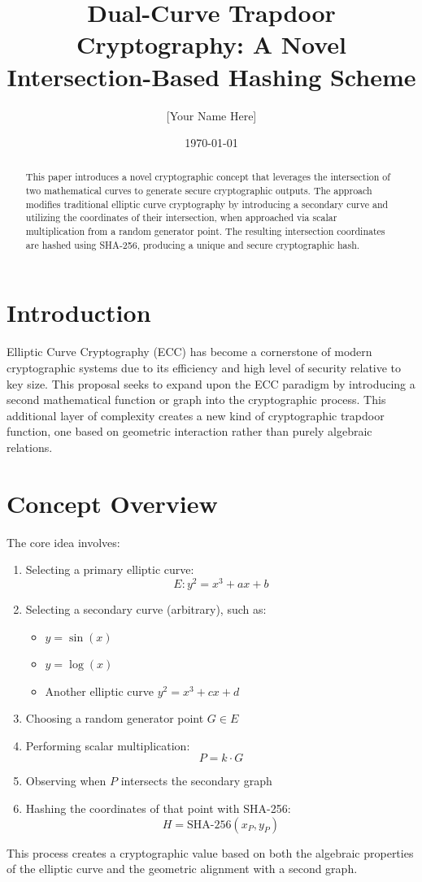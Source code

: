 \documentclass{article}
\title{Dual-Curve Trapdoor Cryptography: A Novel Intersection-Based Hashing Scheme}
\author{[Your Name Here]}
\date{\today}
\begin{document}
\maketitle

\begin{abstract}
This paper introduces a novel cryptographic concept that leverages the intersection of two mathematical curves to generate secure cryptographic outputs. The approach modifies traditional elliptic curve cryptography by introducing a secondary curve and utilizing the coordinates of their intersection, when approached via scalar multiplication from a random generator point. The resulting intersection coordinates are hashed using SHA-256, producing a unique and secure cryptographic hash.
\end{abstract}

\section{Introduction}
Elliptic Curve Cryptography (ECC) has become a cornerstone of modern cryptographic systems due to its efficiency and high level of security relative to key size. This proposal seeks to expand upon the ECC paradigm by introducing a second mathematical function or graph into the cryptographic process. This additional layer of complexity creates a new kind of cryptographic trapdoor function, one based on geometric interaction rather than purely algebraic relations.

\section{Concept Overview}
The core idea involves:
\begin{enumerate}
  \item Selecting a primary elliptic curve:
  \[ E: y^2 = x^3 + ax + b \]
  \item Selecting a secondary curve (arbitrary), such as:
  \begin{itemize}
    \item \( y = \sin(x) \)
    \item \( y = \log(x) \)
    \item Another elliptic curve \( y^2 = x^3 + cx + d \)
  \end{itemize}
  \item Choosing a random generator point \( G \in E \)
  \item Performing scalar multiplication:
  \[ P = k \cdot G \]
  \item Observing when \( P \) intersects the secondary graph
  \item Hashing the coordinates of that point with SHA-256:
  \[ H = \text{SHA-256}(x_P, y_P) \]
\end{enumerate}
This process creates a cryptographic value based on both the algebraic properties of the elliptic curve and the geometric alignment with a second graph.
\end{document}
